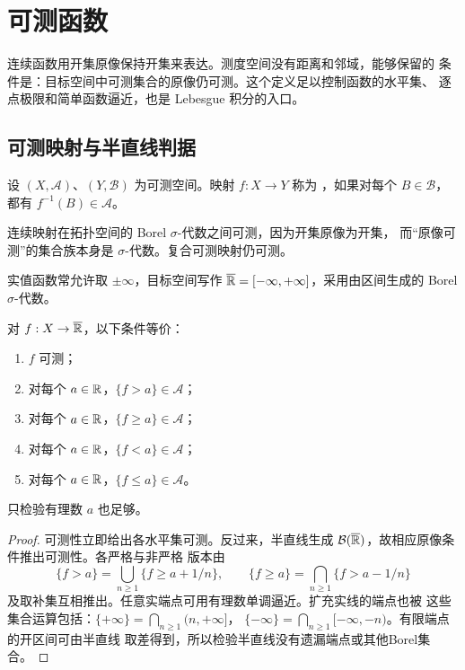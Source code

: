 \chapter{可测函数}
\label{chap:measurable-functions}

连续函数用开集原像保持开集来表达。测度空间没有距离和邻域，能够保留的
条件是：目标空间中可测集合的原像仍可测。这个定义足以控制函数的水平集、
逐点极限和简单函数逼近，也是 Lebesgue 积分的入口。

\section{可测映射与半直线判据}

\begin{definition}
设 $(X,\mathcal A)$、$(Y,\mathcal B)$ 为可测空间。映射 $f:X\to Y$ 称为
，如果对每个 $B\in\mathcal B$，都有
$f^{-1}(B)\in\mathcal A$。
\end{definition}

连续映射在拓扑空间的 Borel $\sigma$-代数之间可测，因为开集原像为开集，
而“原像可测”的集合族本身是 $\sigma$-代数。复合可测映射仍可测。

实值函数常允许取 $\pm\infty$，目标空间写作
$\overline{\mathbb{R}}=[-\infty,+\infty]$，采用由区间生成的 Borel
$\sigma$-代数。

\begin{theorem}[半直线判据]
\label{thm:measurable-halfline-criteria}
对 $f:X\to\overline{\mathbb{R}}$，以下条件等价：
\begin{enumerate}[label=\textup{(\roman*)}]
 \item $f$ 可测；
 \item 对每个 $a\in\mathbb{R}$，$\{f>a\}\in\mathcal A$；
 \item 对每个 $a\in\mathbb{R}$，$\{f\ge a\}\in\mathcal A$；
 \item 对每个 $a\in\mathbb{R}$，$\{f<a\}\in\mathcal A$；
 \item 对每个 $a\in\mathbb{R}$，$\{f\le a\}\in\mathcal A$。
\end{enumerate}
只检验有理数 $a$ 也足够。
\end{theorem}

\begin{proof}
可测性立即给出各水平集可测。反过来，半直线生成
$\mathcal B(\overline{\mathbb{R}})$，故相应原像条件推出可测性。各严格与非严格
版本由
\[
 \{f>a\}=\bigcup_{n\ge1}\{f\ge a+1/n\},
 \qquad
 \{f\ge a\}=\bigcap_{n\ge1}\{f>a-1/n\}
\]
及取补集互相推出。任意实端点可用有理数单调逼近。扩充实线的端点也被
这些集合运算包括：$\{+\infty\}=\bigcap_{n\ge1}(n,+\infty]$，
$\{-\infty\}=\bigcap_{n\ge1}[-\infty,-n)$。有限端点的开区间可由半直线
取差得到，所以检验半直线没有遗漏端点或其他Borel集合。
\end{proof}

